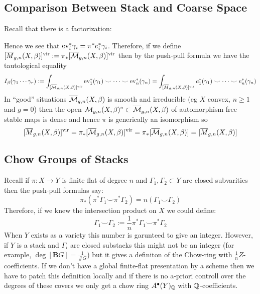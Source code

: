 \documentclass[12pt]{article}
\newcommand{\Mbar}{\ol{\M}}
\begin{document}
\subsection{Comparison Between Stack and Coarse Space}

Recall that there is a factorization:
\begin{center}
\end{center}
Hence we see that $\mathrm{ev}^*_i \gamma_i = \pi^* e^*_i \gamma_i$. Therefore, if we define $[\ol{M}_{g,n}(X, \beta)]^{\vir} := \pi_* [\Mbar_{g,n}(X, \beta)]^{\vir}$ then by the push-pull formula we have the tautological equality
\[ I_\beta(\gamma_1 \cdots \gamma_r) := \int_{[\Mbar_{g,n}(X,\beta)]^{\vir}} \ev_1^*(\gamma_1) \smile \cdots \smile \ev_n^*(\gamma_n) =  \int_{[\ol{M}_{g,n}(X,\beta)]^{\vir}} e_1^*(\gamma_1) \smile \cdots \smile e_n^*(\gamma_n) \]
In ``good'' situations $\Mbar_{g,n}(X, \beta)$ is smooth and irreducible (eg $X$ convex, $n \ge 1$ and $g = 0$) then the open $\M_{g,n}(X, \beta)^\circ \subset \Mbar_{g,n}(X, \beta)$ of automorphism-free stable maps is dense and hence $\pi$ is generically an isomorphism so
\[ [\ol{M}_{g,n}(X, \beta)]^{\vir} = \pi_* [\Mbar_{g,n}(X, \beta)]^{\vir} = \pi_* [\Mbar_{g,n}(X, \beta)] = [\ol{M}_{g,n}(X, \beta)] \]

\subsection{Chow Groups of Stacks}

Recall if $\pi : X \to Y$ is finite flat of degree $n$ and $\Gamma_1, \Gamma_2 \subset Y$ are closed subvarities then the push-pull formulas say:
\[ \pi_* (\pi^* \Gamma_1 \smile \pi^* \Gamma_2) = n (\Gamma_1 \smile \Gamma_2) \]
Therefore, if we knew the intersection product on $X$ we could define:
\[ \Gamma_1 \smile \Gamma_2 := \frac{1}{n} \pi^* \Gamma_1 \smile \pi^* \Gamma_2 \]
When $Y$ exists as a variety this number is garunteed to give an integer. However, if $Y$ is a stack and $\Gamma_i$ are closed substacks this might not be an integer (for example, $\deg{[\mathbf{B} G]} = \frac{1}{\# G}$) but it gives a definiton of the Chow-ring with $\frac{1}{n} Z$-coefficients. If we don't have a global finite-flat presentation by a scheme then we have to patch this definition locally and if there is no a-priori controll over the degrees of these covers we only get a chow ring $A^\bullet(Y)_{\mathbb{Q}}$ with $\mathbb{Q}$-coefficients.  
\end{document}
